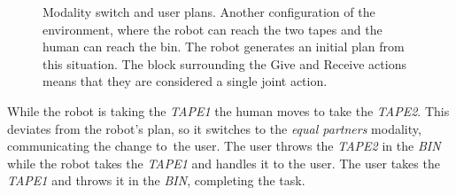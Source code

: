 \begin{itemize}
\begin{figure}
  \centering
  \caption[Robot coworker experiment 2]{Modality switch and user plans. Another configuration of
    the environment, where the robot can reach the two tapes and the
    human can reach the bin. The robot generates an initial plan
  from this situation. The block surrounding the Give and Receive
  actions means that they are considered a single joint action.}
  \centering
  \label{fig:coworker_results_scenario2}
\end{figure}

While the robot is taking the \textit{TAPE1} the human moves
to take the \textit{TAPE2}. This deviates from the robot's plan, so it
switches to the \textit{equal partners} modality, communicating the change to\
the user. The user throws the \textit{TAPE2} in the \textit{BIN} while
the robot takes the \textit{TAPE1} and handles it to the user. The user
takes the \textit{TAPE1} and throws it in the \textit{BIN}, completing the task.


\end{itemize}
